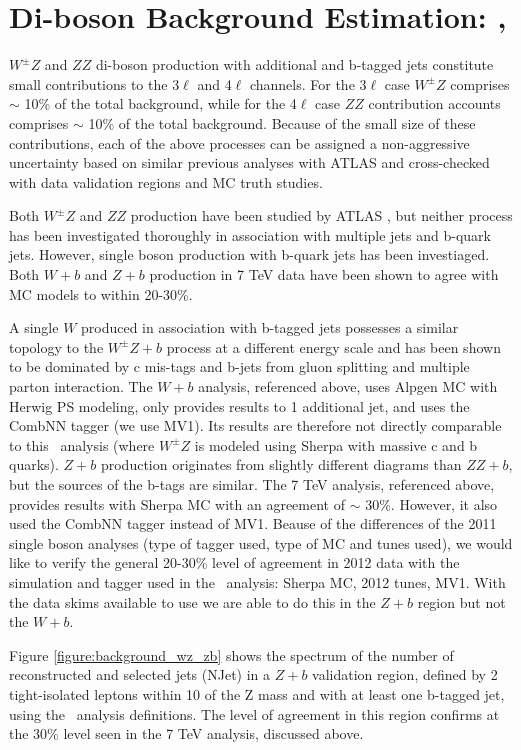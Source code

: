 \section{Di-boson Background Estimation: \WZ, \ZZ }

\label{section:wz}
$W^{\pm}Z$ and $ZZ$ di-boson production with additional and b-tagged jets constitute small contributions to 
the 3$\ell$ and 4$\ell$ channels. For the 3$\ell$ case $W^{\pm}Z$ comprises $\sim$ 10\% of the total background, while for
the 4$\ell$ case $ZZ$ contribution accounts comprises $\sim$ 10\% of the total background. 
Because of the small size of these contributions, each of the above processes can be assigned a 
non-aggressive uncertainty based on similar previous analyses with ATLAS and cross-checked with data validation 
regions and MC truth studies. 

Both $W^{\pm}Z$ and $ZZ$ production have been studied by ATLAS \cite{WZAtlas}\cite{ZZAtlas}, but neither process
has been investigated thoroughly in association with multiple jets and b-quark jets. However, single boson production with
b-quark jets has been investiaged. Both $W+b$ \cite{WbAtlas} 
and $Z+b$ \cite{ZbAtlas} production in 7 TeV data have been shown to agree with MC models to within 20-30\%. 

A single $W$ produced in association with b-tagged jets possesses a similar topology to the $W^{\pm}Z+b$ 
process at a different energy scale and has been shown to be dominated by c mis-tags and b-jets from gluon splitting 
and multiple parton interaction. The $W+b$ analysis, referenced above, uses Alpgen MC with Herwig PS modeling, only provides
results to 1 additional jet, and uses the CombNN tagger (we use MV1). Its results are therefore not directly comparable to this \tth\ analysis (where $W^{\pm}Z$ is modeled using Sherpa with massive c and b quarks). $Z+b$ production originates from slightly different diagrams than $ZZ+b$, but the sources of the b-tags are similar. The 7 TeV analysis, referenced above, provides results with Sherpa MC with an agreement of $\sim$ 30\%. However, it also used the CombNN tagger instead of MV1. Beause of the differences of the 2011 single boson analyses (type of tagger used, type of MC and tunes used), we would like to verify the general 20-30\% level of agreement in 2012 data with the simulation and tagger used in the \tth\ analysis: Sherpa MC, 2012 tunes, MV1. With the data skims available to use we are able to do this in the $Z+b$ region but not the $W+b$.  


Figure \ref{figure:background_wz_zb} shows the spectrum of the number of reconstructed and selected jets (NJet) in a 
$Z+b$ validation region, defined by 2 tight-isolated leptons within 10 \gev of the Z mass and with at 
least one b-tagged jet, using the \tth\ analysis definitions. The level of agreement in this region confirms 
at the  30\% level seen in the 7 TeV analysis, discussed above. 

